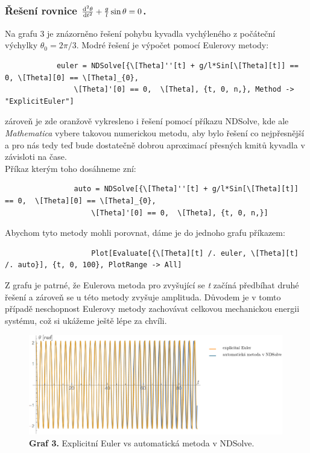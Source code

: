 \documentclass[reqno, a4paper]{amsart}
\begin{document}
		\subsubsection{Řešení rovnice \textit{$\frac{\mathrm{d}^2 {\theta}}{\mathrm{d} {t}^2} + \frac{g}{l} \sin \theta = 0$}.}Na grafu 3 je znázorněno řešení pohybu kyvadla vychýleného z počáteční výchylky $\theta_{0}=2\pi/3$. Modré řešení je výpočet pomocí Eulerovy metody: 
		\begin{verbatim}
			euler = NDSolve[{\[Theta]''[t] + g/l*Sin[\[Theta][t]] == 0, \[Theta][0] == \[Theta]_{0}, 
				\[Theta]'[0] == 0,  \[Theta], {t, 0, n,}, Method -> "ExplicitEuler"]
			\end{verbatim}
			zároveň je zde oranžově vykresleno i řešení pomocí příkazu NDSolve, kde ale \textit{Mathematica} vybere takovou numerickou metodu, aby bylo řešení co nejpřesnější a pro nás tedy teď bude dostatečně dobrou aproximací přesných kmitů kyvadla v závisloti na čase. 
			\\
			Příkaz kterým toho dosáhneme zní:
			\begin{verbatim}
				auto = NDSolve[{\[Theta]''[t] + g/l*Sin[\[Theta][t]] == 0, 	\[Theta][0] == \[Theta]_{0}, 
					\[Theta]'[0] == 0,  \[Theta], {t, 0, n,}]
				\end{verbatim}	
				Abychom tyto metody mohli porovnat, dáme je do jednoho grafu příkazem:
				\begin{verbatim}
					Plot[Evaluate[{\[Theta][t] /. euler, \[Theta][t] /. auto}], {t, 0, 100}, PlotRange -> All]
				\end{verbatim}	
				Z grafu je patrné, že Eulerova metoda pro zvyšující se \textit{t} začíná předbíhat druhé řešení a zároveň se u  této metody zvyšuje amplituda. Důvodem je v tomto případě neschopnost Eulerovy metody zachovávat celkovou mechanickou energii systému, což si ukážeme ještě lépe za chvíli.
				\begin{figure}[h]
					\centering
					\includegraphics[width=0.99\textwidth]{vs}
					\caption*{\textbf{Graf 3.} Explicitní Euler vs automatická metoda v NDSolve.}  
				\end{figure}
				\\
				\\
\end{document}
